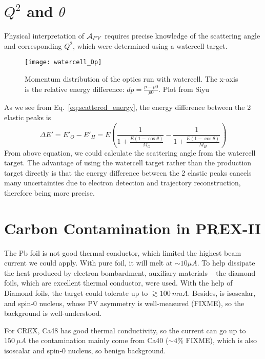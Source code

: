 \section{$Q^2$ and $\theta$}
Physical interpretation of $\mathcal{A}_{PV}$ requires precise knowledge
of the scattering angle and corresponding $Q^2$, which were determined using
a watercell target. 
\begin{figure}
    \centering
    \texttt{[image: watercell\_Dp]}
    \caption{Momentum distribution of the optics run with watercell. The x-axis
    is the relative energy difference: $dp = \frac{p - p0}{p0}$. Plot from Siyu}
\end{figure}
As we see from Eq.~\ref{eq:scattered_energy}, the energy difference between the
2 elastic peaks is
\begin{equation}
    \Delta E' = E'_O - E'_H = E\left( \frac{1}{1 + \frac{E(1-\cos\theta)}{M_O}} -
    \frac{1}{1 + \frac{E(1-\cos\theta)}{M_H}} \right)
\end{equation}
From above equation, we could calculate the scattering angle from the watercell
target. The advantage of using the watercell target rather than the production
target directly is that the energy difference between the 2 elastic peaks cancels
many uncertainties due to electron detection and trajectory reconstruction, therefore
being more precise.

\section{Carbon Contamination in PREX-II}
The Pb foil is not good thermal conductor, which limited the highest beam current
we could apply. With pure \Pb foil, it will melt at $\sim 10 \mu A$. To help 
dissipate the heat produced by electron bombardment, auxiliary materials -- the 
diamond foils, which are excellent thermal conductor, were used. 
With the help of Diamond foils, the
\Pb target could tolerate up to $\gtrsim 100\ mu A$. Besides, \C is isoscalar, and spin-0 
nucleus, whose PV asymmetry is well-measured (FIXME), so the background is 
well-understood. 

For CREX, Ca48 has good thermal conductivity, so the current can go up to $150\ \mu A$
the contamination mainly come from Ca40 ($\sim 4\%$ FIXME), which is also isoscalar
and spin-0 nucleus, so benign background.

